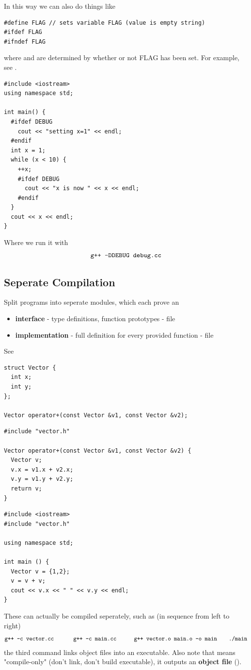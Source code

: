 \documentclass[english, 11pt]{article}
\begin{document}
In this way we can also do things like
\begin{lstlisting}
#define FLAG // sets variable FLAG (value is empty string)
#ifdef FLAG
#ifndef FLAG
\end{lstlisting}
where  and  are determined by whether or not FLAG has been set. For example, see .
\begin{lstlisting}
#include <iostream>
using namespace std;

int main() {
  #ifdef DEBUG
    cout << "setting x=1" << endl;
  #endif
  int x = 1;
  while (x < 10) {
    ++x;
    #ifdef DEBUG
      cout << "x is now " << x << endl;
    #endif
  }
  cout << x << endl;
}
\end{lstlisting}
Where we run it with
\[ \mbox{\texttt{g++ -DDEBUG debug.cc}} \]

\subsection{Seperate Compilation}

Split programs into seperate modules, which each prove an
\begin{itemize}
  \item \textbf{interface} - type definitions, function prototypes -  file
  \item \textbf{implementation} - full definition for every provided function -  file
\end{itemize}

\begin{exmp}
  See 
  \begin{lstlisting}[title=vector.h]
struct Vector {
  int x;
  int y;
};

Vector operator+(const Vector &v1, const Vector &v2);
  \end{lstlisting}
  \begin{lstlisting}[title=vector.cc]
#include "vector.h"

Vector operator+(const Vector &v1, const Vector &v2) {
  Vector v;
  v.x = v1.x + v2.x;
  v.y = v1.y + v2.y;
  return v;
}
  \end{lstlisting}
  \begin{lstlisting}[title=main.cc]
#include <iostream>
#include "vector.h"

using namespace std;

int main () {
  Vector v = {1,2};
  v = v + v;
  cout << v.x << " " << v.y << endl;
}
  \end{lstlisting}
  These can actually be compiled seperately, such as (in sequence from left to right)
  \[ \mbox{\texttt{g++ -c vector.cc} \ \ \ \ \ \ \ \ \ \texttt{g++ -c main.cc}} \ \ \ \ \ \ \ \ \ \texttt{g++ vector.o main.o -o main}\ \ \ \ \ \ \texttt{./main} \]
  the third command links object files into an executable. Also note that  means "compile-only" (don't link, don't build executable), it outputs an \textbf{object file} ().
\end{exmp}
\end{document}
